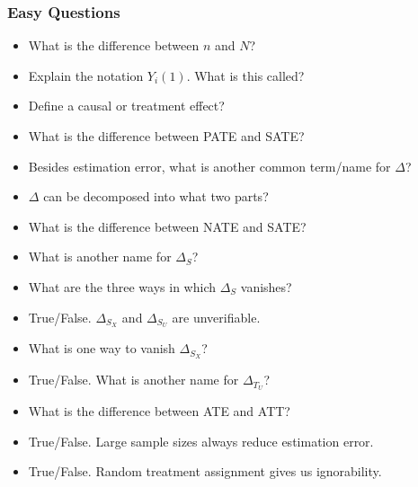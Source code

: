 \documentclass[11pt]{article}
\begin{document}
\subsubsection{Easy Questions}


\begin{itemize}

\item What is the difference between $n$ and $N$?

\item Explain the notation $Y_i(1)$.  What is this called?

\item Define a causal or treatment effect?

\item What is the difference between PATE and SATE?

\item Besides estimation error, what is another common term/name for $\Delta$?

\item $\Delta$ can be decomposed into what two parts?

\item What is the difference between NATE and SATE?

\item What is another name for $\Delta_S$?

\item What are the three ways in which $\Delta_S$ vanishes?

\item True/False.  $\Delta_{S_X}$ and $\Delta_{S_U}$ are unverifiable.

\item What is one way to vanish $\Delta_{S_X}$?

\item True/False.  What is another name for $\Delta_{T_U}$?

\item What is the difference between ATE and ATT?

\item True/False.  Large sample sizes always reduce estimation error.

\item True/False.  Random treatment assignment gives us ignorability.


\end{itemize}
\end{document}
